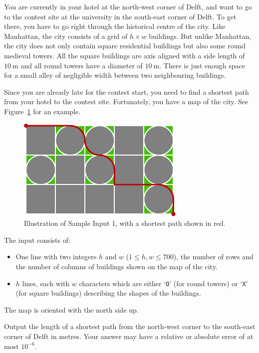 
\newcommand{\maxw}{700}

%
You are currently in your hotel at the north-west corner of Delft, and want to go to the contest site at the university in the south-east corner of Delft.
To get there, you have to go right through the historical centre of the city.
Like Manhattan, the city consists of a grid of $h \times w$ buildings.
But unlike Manhattan, the city does not only contain square residential buildings but also some round medieval towers.
All the square buildings are axis aligned with a side length of $10~\text{m}$ and all round towers have a diameter of $10~\text{m}$.
There is just enough space for a small alley of negligible width between two neighbouring buildings.

Since you are already late for the contest start, you need to find a shortest path from your hotel to the contest site.
Fortunately, you have a map of the city. See Figure~\ref{fig:d} for an example.

\begin{figure}[h]
	\centering
	\includegraphics{sample}
        \caption{Illustration of Sample Input 1, with a shortest path shown in red.}
	\label{fig:d}
\end{figure}

\begin{Input}
	The input consists of:
	\begin{itemize}
		\item One line with two integers $h$ and $w$ ($1 \leq h,w \leq \maxw$), the number of rows and the number of columns of buildings shown on the map of the city.
		\item $h$ lines, each with $w$ characters which are either `\texttt{O}' (for round towers) or `\texttt{X}' (for square buildings) describing the shapes of the buildings.
	\end{itemize}
	The map is oriented with the north side up.
\end{Input}

\begin{Output}
	Output the length of a shortest path from the north-west corner to the south-east corner of Delft in metres.
	Your answer may have a relative or absolute error of at most $10^{-6}$.
\end{Output}
